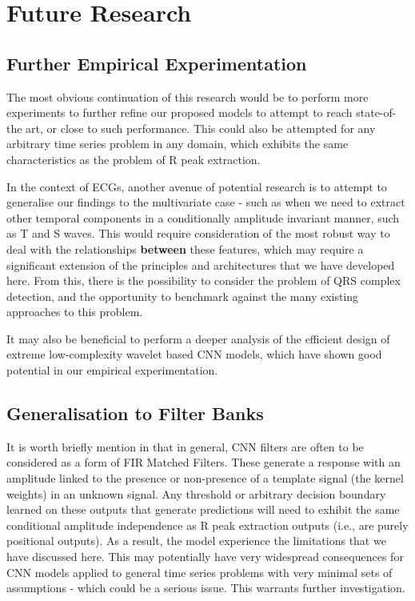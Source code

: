 \documentclass[9pt,conference]{IEEEtran}
\begin{document}
\section{Future Research}

\subsection{Further Empirical Experimentation}
The most obvious continuation of this research would be to perform more experiments to further refine our proposed models to attempt to reach state-of-the art, or close to such performance. This could also be attempted for any arbitrary time series problem in any domain, which exhibits the same characteristics as the problem of R peak extraction.

In the context of ECGs, another avenue of potential research is to attempt to generalise our findings to the multivariate case - such as when we need to extract other temporal components in a conditionally amplitude invariant manner, such as T and S waves. This would require consideration of the most robust way to deal with the relationships \textbf{between} these features, which may require a significant extension of the principles and architectures that we have developed here. From this, there is the possibility to consider the problem of QRS complex detection, and the opportunity to benchmark against the many existing approaches to this problem.

It may also be beneficial to perform a deeper analysis of the efficient design of extreme low-complexity wavelet based CNN models, which have shown good potential in our empirical experimentation.

\subsection{Generalisation to Filter Banks}
It is worth briefly mention in that in general, CNN filters are often to be considered as a form of FIR Matched Filters. These generate a response with an amplitude linked to the presence or non-presence of a template signal (the kernel weights) in an unknown signal. Any threshold or arbitrary decision boundary learned on these outputs that generate predictions will need to exhibit the same conditional amplitude independence as R peak extraction outputs (i.e., are purely positional outputs). As a result, the model experience the limitations that we have discussed here. This may potentially have very widespread consequences for CNN models applied to general time series problems with very minimal sets of assumptions - which could be a serious issue. This warrants further investigation.
\end{document}
